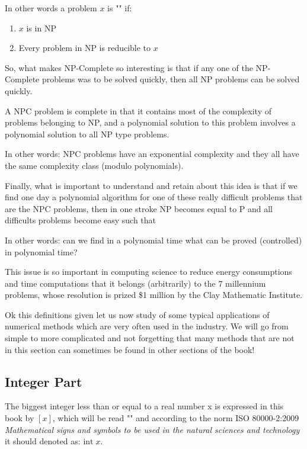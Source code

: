 In other words a problem $x$ is "" if:
	\begin{enumerate}
		\item $x$ is in NP
		\item Every problem in NP is reducible to $x$
	\end{enumerate}
So, what makes NP-Complete so interesting is that if any one of the NP-Complete problems was to be solved quickly, then all NP problems can be solved quickly.

A NPC problem is complete in that it contains most of the complexity of problems belonging to NP, and a polynomial solution to this problem involves a polynomial solution to all NP type problems.

In other words: NPC problems have an exponential complexity and they all have the same complexity class (modulo polynomials).

Finally, what is important to understand and retain about this idea is that if we find one day a polynomial algorithm for one of these really difficult problems that are the NPC problems, then in one stroke NP becomes equal to P and all difficults problems become easy such that 
	
In other words: can we find in a polynomial time what can be proved (controlled) in polynomial time?

	\begin{tcolorbox}[title=Remark,colframe=black,arc=10pt]
This issue is so important in computing science to reduce energy consumptions and time computations that it belongs (arbitrarily) to the 7 millennium problems, whose resolution is prized \$1 million  by the Clay Mathematic Institute. 
	\end{tcolorbox}
	
Ok this definitions given let us now study of some typical applications of numerical methods which are very often used in the industry. We will go from simple to more complicated and not forgetting that many methods that are not in this section can sometimes be found in other sections of the book!

\subsection{Integer Part}

The biggest integer less than or equal to a real number x is expressed in this book by $[x]$, which will be read "" and according to the norm ISO 80000-2:2009 \textit{Mathematical signs and symbols to be used in the natural sciences and technology} it should denoted as: $\text{int} \; x$.

